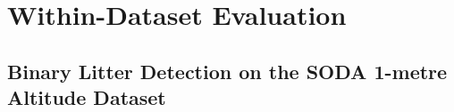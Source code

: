 

\section{Within-Dataset Evaluation}
\label{sec:5_within_dataset_exp}


\subsection{Binary Litter Detection on the SODA 1-metre Altitude Dataset}
\label{subsec:5_soda01m_dataset_exp}


